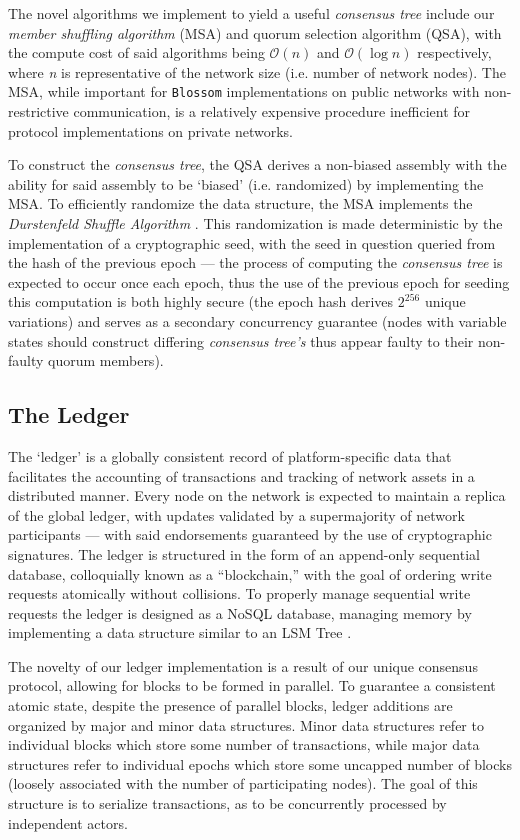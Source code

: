 The novel algorithms we implement to yield a useful \textit{consensus tree} include our \textit{member shuffling algorithm} (MSA) and quorum selection algorithm (QSA), with the compute cost of said algorithms being \(\mathcal{O}(n)\) and \(\mathcal{O}(\log n)\) respectively, where \textit{n} is representative of the network size (i.e. number of network nodes). The MSA, while important for \texttt{Blossom} implementations on public networks with non-restrictive communication, is a relatively expensive procedure inefficient for protocol implementations on private networks.

To construct the \textit{consensus tree}, the QSA derives a non-biased assembly with the ability for said assembly to be ‘biased’ (i.e. randomized) by implementing the MSA. To efficiently randomize the data structure, the MSA implements the \textit{Durstenfeld Shuffle Algorithm} \cite{Durstenfeld1964}. This randomization is made deterministic by the implementation of a cryptographic seed, with the seed in question queried from the hash of the previous epoch — the process of computing the \textit{consensus tree} is expected to occur once each epoch, thus the use of the previous epoch for seeding this computation is both highly secure (the epoch hash derives \(2^{256}\) unique variations) and serves as a secondary concurrency guarantee (nodes with variable states should construct differing \textit{consensus tree’s} thus appear faulty to their non-faulty quorum members).

\subsection{The Ledger}\label{struc:ledger}
The ‘ledger’ is a globally consistent record of platform-specific data that facilitates the accounting of transactions and tracking of network assets in a distributed manner. Every node on the network is expected to maintain a replica of the global ledger, with updates validated by a supermajority of network participants — with said endorsements guaranteed by the use of cryptographic signatures. The ledger is structured in the form of an append-only sequential database, colloquially known as a “blockchain,” with the goal of ordering write requests atomically without collisions. To properly manage sequential write requests the ledger is designed as a NoSQL database, managing memory by implementing a data structure similar to an LSM Tree \cite{Strauch2011-hy}\cite{Oneil1996-kb}. 

The novelty of our ledger implementation is a result of our unique consensus protocol, allowing for blocks to be formed in parallel. To guarantee a consistent atomic state, despite the presence of parallel blocks, ledger additions are organized by major and minor data structures. Minor data structures refer to individual blocks which store some number of transactions, while major data structures refer to individual epochs which store some uncapped number of blocks (loosely associated with the number of participating nodes). The goal of this structure is to serialize transactions, as to be concurrently processed by independent actors.

